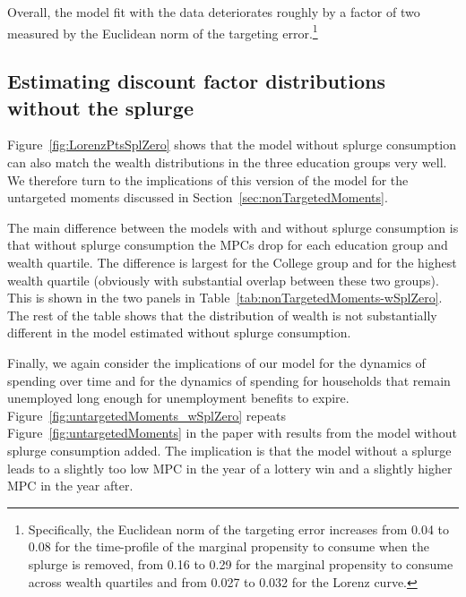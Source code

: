 \documentclass{econsocart}
\begin{document}
Overall, the model fit with the data deteriorates roughly by a factor of two measured by the Euclidean norm of the targeting error.\footnote{Specifically, the Euclidean norm of the targeting error increases from 0.04 to 0.08 for the time-profile of the marginal propensity to consume when the splurge is removed, from 0.16 to 0.29 for the marginal propensity to consume across wealth quartiles and from 0.027 to 0.032 for the Lorenz curve.}



\subsection{Estimating discount factor distributions without the splurge}
\whenintegrated{\label{app:nosplurge-estimating-betas}} %

Figure~\ref{fig:LorenzPtsSplZero} shows that the model without splurge consumption can also match the wealth distributions in the three education groups very well. We therefore turn to the implications of this version of the model for the untargeted moments discussed in Section~\ref{sec:nonTargetedMoments}.



The main difference between the models with and without splurge consumption is that without splurge consumption the MPCs drop for each education group and wealth quartile.
The difference is largest for the College group and for the highest wealth quartile (obviously with substantial overlap between these two groups). This is shown in the two panels in Table~\ref{tab:nonTargetedMoments-wSplZero}. The rest of the table shows that the distribution of wealth is not substantially different in the model estimated without splurge consumption.



Finally, we again consider the  implications of our model for the dynamics of spending over time and for the dynamics of spending for households that remain unemployed long enough for unemployment benefits to expire. Figure~\ref{fig:untargetedMoments_wSplZero} repeats Figure~\ref{fig:untargetedMoments} in the paper with results from the model without splurge consumption added. The implication is that the model without a splurge leads to a slightly too low MPC in the year of a lottery win and a slightly higher MPC in the year after.
\end{document}
